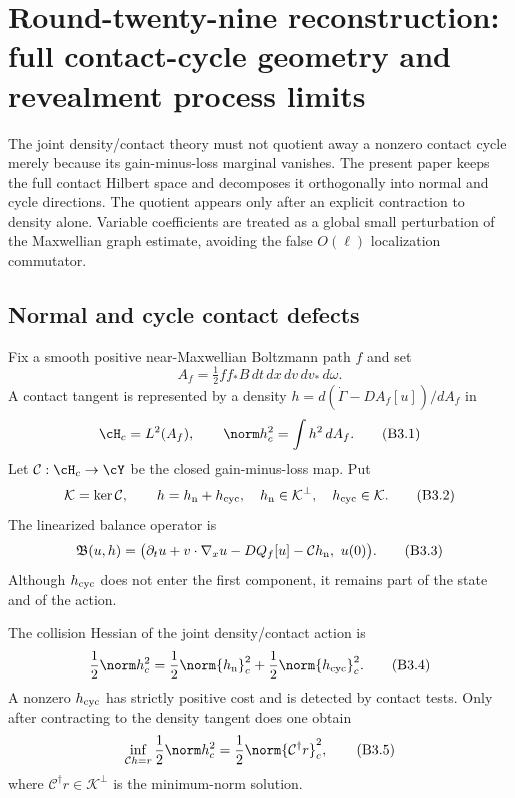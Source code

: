 \section{Round-twenty-nine reconstruction: full contact-cycle geometry and revealment process limits}
\label{sec:r29-b3}

The joint density/contact theory must not quotient away a nonzero contact
cycle merely because its gain-minus-loss marginal vanishes.  The present
paper keeps the full contact Hilbert space and decomposes it orthogonally into
normal and cycle directions.  The quotient appears only after an explicit
contraction to density alone.  Variable coefficients are treated as a global
small perturbation of the Maxwellian graph estimate, avoiding the false
$O(\ell)$ localization commutator.

\subsection{Normal and cycle contact defects}

Fix a smooth positive near-Maxwellian Boltzmann path $f$ and set
\[
 A_f=\tfrac12ff_*B\,dt\,dx\,dv\,dv_*\,d\omega.
\]
A contact tangent is represented by a density
$h=d(\dot\Gamma-DA_f[u])/dA_f$ in
\[
 \cH_c=L^2(A_f),\qquad \norm h_c^2=\int h^2\,dA_f.        \tag{B3.1}
\]
Let $\mathcal C:\cH_c\to\cY$ be the closed gain-minus-loss map.  Put
\[
 \mathcal K=\ker\mathcal C,\qquad
 h=h_{\rm n}+h_{\rm cyc},
 \quad h_{\rm n}\in\mathcal K^\perp,
 \quad h_{\rm cyc}\in\mathcal K.                         \tag{B3.2}
\]
The linearized balance operator is
\[
 \mathfrak B(u,h)=
 \bigl(\partial_tu+v\cdot\nabla_xu-DQ_f[u]-\mathcal Ch_{\rm n},\ u(0)\bigr).
                                                                    \tag{B3.3}
\]
Although $h_{\rm cyc}$ does not enter the first component, it remains part of
the state and of the action.

\begin{lemma}
\label{lem:r29-b3-split}
The collision Hessian of the joint density/contact action is
\[
 {1\over2}\norm h_c^2
 ={1\over2}\norm{h_{\rm n}}_c^2+{1\over2}\norm{h_{\rm cyc}}_c^2.        \tag{B3.4}
\]
A nonzero $h_{\rm cyc}$ has strictly positive cost and is detected by contact
tests.  Only after contracting to the density tangent does one obtain
\[
 \inf_{\mathcal Ch=r}{1\over2}\norm h_c^2
 ={1\over2}\norm{\mathcal C^\dagger r}_c^2,              \tag{B3.5}
\]
where $\mathcal C^\dagger r\in\mathcal K^\perp$ is the minimum-norm solution.
\end{lemma}

